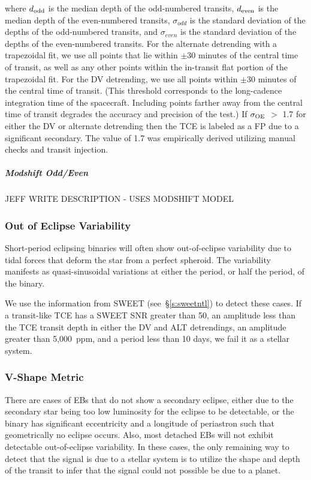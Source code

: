 \noindent where $d_{\rm odd}$ is the median depth of the odd-numbered transits, $d_{\rm even}$ is the median depth of the even-numbered transits, $\sigma_{odd}$ is the standard deviation of the depths of the odd-numbered transits, and $\sigma_{even}$ is the standard deviation of the depths of the even-numbered transits. For the alternate detrending with a trapezoidal fit, we use all points that lie within $\pm$30 minutes of the central time of transit, as well as any other points within the in-transit flat portion of the trapezoidal fit. For the DV detrending, we use all points within $\pm$30 minutes of the central time of transit. (This threshold corresponds to the long-cadence integration time of the \kepler{} spacecraft. Including points farther away from the central time of transit degrades the accuracy and precision of the test.) If $\sigma_{\rm OE}$ $>$ 1.7 for either the DV or alternate detrending then the TCE is labeled as a FP due to a significant secondary. The value of 1.7 was empirically derived utilizing manual checks and transit injection.


\subparagraph{Modshift Odd/Even}

JEFF WRITE DESCRIPTION - USES MODSHIFT MODEL



\subsubsection{Out of Eclipse Variability}
\label{s:sweeteb}
Short-period eclipsing binaries will often show out-of-eclipse variability due to tidal forces that deform the star from a perfect spheroid. The variability manifests as quasi-sinusoidal variations at either the period, or half the period, of the binary.

We use the information from SWEET (see~\S\ref{s:sweetntl}) to detect these cases. If a transit-like TCE has a SWEET SNR greater than 50, an amplitude less than the TCE transit depth in either the DV and ALT detrendings, an amplitude greater than 5,000~ppm, and a period less than 10 days, we fail it as a stellar system.



\subsubsection{V-Shape Metric}
\label{s:shapemetric}
There are cases of EBs that do not show a secondary eclipse, either due to the secondary star being too low luminosity for the eclipse to be detectable, or the binary has significant eccentricity and a longitude of periastron such that geometrically no eclipse occurs. Also, most detached EBs will not exhibit detectable out-of-eclipse variability. In these cases, the only remaining way to detect that the signal is due to a stellar system is to utilize the shape and depth of the transit to infer that the signal could not possible be due to a planet.

